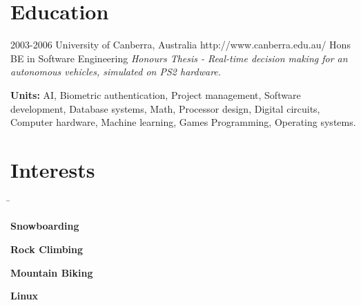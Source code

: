 \documentclass{article}
\begin{document}
\section*{Education}

\begin{education}
{2003-2006}
{University of Canberra, Australia} 
{http://www.canberra.edu.au/} 
{Hons BE in Software Engineering}%
\textit{Honours Thesis - Real-time decision making for an autonomous vehicles, simulated
on PS2 hardware.}\\
\rule{0mm}{5mm}\textbf{Units:} {AI, Biometric authentication, Project management, Software development, Database systems, Math, Processor design, Digital circuits, Computer hardware, Machine learning, Games Programming, Operating systems.} 
\end{education}

\section*{Interests}

\begin{tabbing}
\hspace{5mm} \= \kill
\rule{0mm}{4mm}\sqbullet \> \textbf{Snowboarding}\\
\rule{0mm}{4mm}\sqbullet \> \textbf{Rock Climbing} \\
\rule{0mm}{4mm}\sqbullet \> \textbf{Mountain Biking} \\
\rule{0mm}{4mm}\sqbullet \> \textbf{Linux} \\
\end{tabbing}
\end{document}
